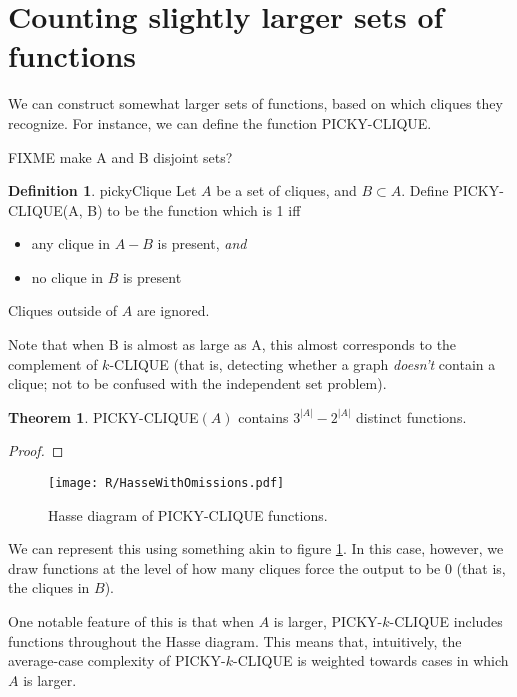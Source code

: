 \documentclass[12pt]{article}
\theoremstyle{definition}
\newtheorem{thm}{Theorem}[section]
\newtheorem{defn}{Definition}[section]
\begin{document}
\section{Counting slightly larger sets of functions}

We can construct somewhat larger sets of functions, based on
which cliques they recognize. For instance, we can define the
function PICKY-CLIQUE.

FIXME make A and B disjoint sets?

\begin{defn}{pickyClique}
Let $A$ be a set of cliques, and $B \subset A$.
Define PICKY-CLIQUE(A, B) to be the function which is 1 iff

\begin{itemize}

\item any clique in $A-B$ is present, {\em and}

\item no clique in $B$ is present

\end{itemize}
Cliques outside of $A$ are ignored.

\end{defn}

Note that when B is almost as large as A,
this almost corresponds to the complement of
$k$-CLIQUE (that is, detecting whether a graph
{\em doesn't} contain a clique; not to be
confused with the independent set problem).

\begin{thm}
\label{pickyDistinct}
PICKY-CLIQUE$(A)$ contains $3^{|A|} - 2^{|A|}$ distinct functions.
\end{thm}
\begin{proof}




\end{proof}



\begin{figure}
\centering
\texttt{[image: R/HasseWithOmissions.pdf]}
\caption{Hasse diagram of PICKY-CLIQUE functions. 
}
\label{fig:Hasse}
\end{figure}


We can represent this using something akin
to figure \ref{fig:Hasse}. In this case, however, we
draw functions at the level of how many
cliques force the output to be 0 (that is,
the cliques in $B$).

One notable feature of this is that when $A$ is
larger, PICKY-$k$-CLIQUE includes functions
throughout the Hasse diagram. This means that,
intuitively, the average-case complexity of
PICKY-$k$-CLIQUE is weighted towards cases
in which $A$ is larger.
\end{document}

